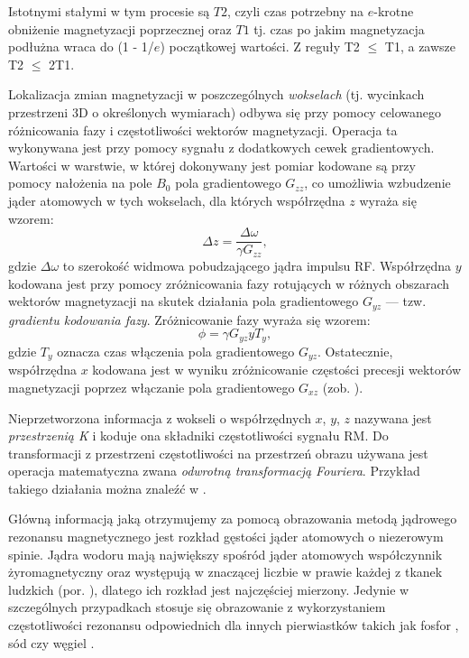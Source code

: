 Istotnymi stałymi w tym procesie są $T2$, czyli czas potrzebny na $e$-krotne obniżenie magnetyzacji poprzecznej oraz $T1$ tj. czas po jakim magnetyzacja podłużna wraca do (1 - 1/$e$) początkowej wartości. Z reguły T2 $\leq$ T1, a zawsze T2 $\leq$ 2T1.   

Lokalizacja zmian magnetyzacji w poszczególnych \textit{wokselach} (tj. wycinkach przestrzeni 3D o określonych wymiarach) odbywa się przy pomocy celowanego różnicowania fazy i częstotliwości wektorów magnetyzacji. Operacja ta wykonywana jest przy pomocy sygnału z dodatkowych cewek gradientowych. Wartości w warstwie, w której dokonywany jest pomiar kodowane są przy pomocy nałożenia na pole $B_0$ pola gradientowego $G_{zz}$, co umożliwia wzbudzenie jąder atomowych w tych wokselach, dla których współrzędna $z$ wyraża się wzorem:
\begin{equation}
\Delta z = \frac{\Delta \omega}{\gamma G_{zz}},
\end{equation}
gdzie $\Delta \omega$ to szerokość widmowa pobudzającego jądra impulsu RF. Współrzędna $y$ kodowana jest przy pomocy zróżnicowania fazy rotujących w różnych obszarach wektorów magnetyzacji na skutek działania pola gradientowego $G_{yz}$ — tzw. \textit{gradientu kodowania fazy}. Zróżnicowanie fazy wyraża się wzorem:
\begin{equation}
\phi = \gamma G_{yz}yT_{y},
\end{equation}
gdzie $T_y$ oznacza czas włączenia pola gradientowego $G_{yz}$. Ostatecznie, współrzędna $x$ kodowana jest w wyniku zróżnicowanie częstości precesji wektorów magnetyzacji poprzez włączanie pola gradientowego $G_{xz}$ (zob. \cite{ObrazowanieMedyczne}). 

Nieprzetworzona informacja z wokseli o współrzędnych $x$, $y$, $z$ nazywana jest \textit{przestrzenią K} i koduje ona składniki częstotliwości sygnału RM. Do transformacji z przestrzeni częstotliwości na przestrzeń obrazu używana jest operacja matematyczna zwana \textit{odwrotną transformacją Fouriera}. Przykład takiego działania można znaleźć w \cite{Q&AinMRI}.

Główną informacją jaką otrzymujemy za pomocą obrazowania metodą jądrowego rezonansu magnetycznego jest rozkład gęstości jąder atomowych o niezerowym spinie. Jądra wodoru mają największy spośród jąder atomowych współczynnik żyromagnetyczny oraz występują w znaczącej liczbie w prawie każdej z tkanek ludzkich (por. \cite{RM2015}), dlatego ich rozkład jest najczęściej mierzony. Jedynie w szczególnych przypadkach stosuje się obrazowanie z wykorzystaniem częstotliwości rezonansu odpowiednich dla innych pierwiastków takich jak fosfor \cite{Sun2016}, sód \cite{Summers1991} czy węgiel \cite{Dria2002}. 

